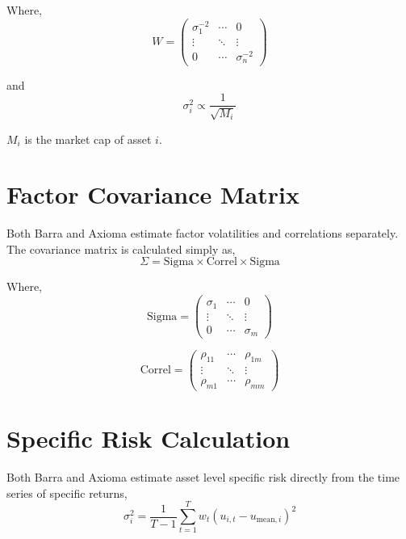 \documentclass{article}
\begin{document}
Where, 
\begin{equation}
W = \begin{pmatrix}
\sigma_1^{-2} & \cdots & 0 \\
\vdots & \ddots & \vdots \\
0 & \cdots & \sigma_n^{-2}
\end{pmatrix}
\end{equation}

and 
\begin{equation}
\sigma_i^2 \propto \frac{1}{\sqrt{M_i}}
\end{equation}

\( M_i \) is the market cap of asset \( i \).

\section*{Factor Covariance Matrix}
Both Barra and Axioma estimate factor volatilities and correlations separately. The covariance matrix is calculated simply as,
\begin{equation}
\Sigma = \text{Sigma} \times \text{Correl} \times \text{Sigma}
\end{equation}

Where,
\begin{equation}
\text{Sigma} = \begin{pmatrix}
\sigma_1 & \cdots & 0 \\
\vdots & \ddots & \vdots \\
0 & \cdots & \sigma_m
\end{pmatrix}
\end{equation}

\begin{equation}
\text{Correl} = \begin{pmatrix}
\rho_{11} & \cdots & \rho_{1m} \\
\vdots & \ddots & \vdots \\
\rho_{m1} & \cdots & \rho_{mm}
\end{pmatrix}
\end{equation}


\section*{Specific Risk Calculation}
Both Barra and Axioma estimate asset level specific risk directly from the time series of specific returns,
\begin{equation}
\sigma_i^2 = \frac{1}{T-1} \sum_{t=1}^{T} w_t \left( u_{i,t} - u_{\text{mean},i} \right)^2
\end{equation}
\end{document}

